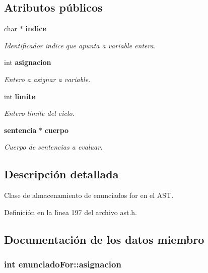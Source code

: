 \subsection*{Atributos p\'{u}blicos}
\begin{CompactItemize}
\item 
char $\ast$ {\bf indice}
\begin{CompactList}\small\item\em Identificador indice que apunta a variable entera. \item\end{CompactList}\item 
int {\bf asignacion}
\begin{CompactList}\small\item\em Entero a asignar a variable. \item\end{CompactList}\item 
int {\bf limite}
\begin{CompactList}\small\item\em Entero limite del ciclo. \item\end{CompactList}\item 
{\bf sentencia} $\ast$ {\bf cuerpo}
\begin{CompactList}\small\item\em Cuerpo de sentencias a evaluar. \item\end{CompactList}\end{CompactItemize}


\subsection{Descripci\'{o}n detallada}
Clase de almacenamiento de enunciados for en el AST. 



Definici\'{o}n en la l\'{\i}nea 197 del archivo ast.h.

\subsection{Documentaci\'{o}n de los datos miembro}
\subsubsection{\setlength{\rightskip}{0pt plus 5cm}int {\bf enunciado\-For::asignacion}}\label{structenunciadoFor_o1}


